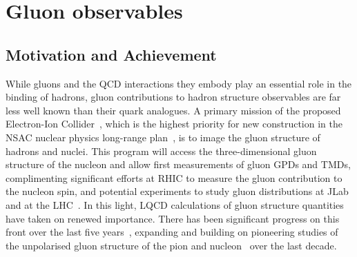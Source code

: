 \section{Gluon observables}

\subsection{Motivation and Achievement}


While gluons and the QCD interactions they embody play an essential role in the binding of hadrons, gluon contributions to hadron structure observables are far less well known than their quark analogues. A primary mission of the proposed Electron-Ion Collider~\cite{Accardi:2012qut,Kalantarians:2014eda}, which is the highest priority for new construction in the NSAC nuclear physics long-range plan~\cite{Geesaman:2015fha}, is to image the gluon structure of hadrons and nuclei. This program will access the three-dimensional gluon structure of the nucleon and allow first measurements of gluon GPDs and TMDs, complimenting significant efforts at RHIC to measure the gluon contribution to the nucleon spin, and potential experiments to study gluon distributions at JLab~\cite{Maxwell:2018gci,Hattawy:2017woc,Dobbs:2017vjw} and at the LHC~\cite{Baltz:2007kq}. 
%
In this light, LQCD calculations of gluon structure quantities have taken on renewed importance. There has been significant progress on this front over the last five years~\cite{Alexandrou:2017oeh,Yang:2016plb,Detmold:2016gpy,Detmold:2017oqb,Winter:2017bfs}, expanding and building on pioneering studies of the unpolarised gluon structure of the pion and nucleon~\cite{Meyer:2007tm,Horsley:2012pz,Alexandrou:2013tfa} over the last decade. 

